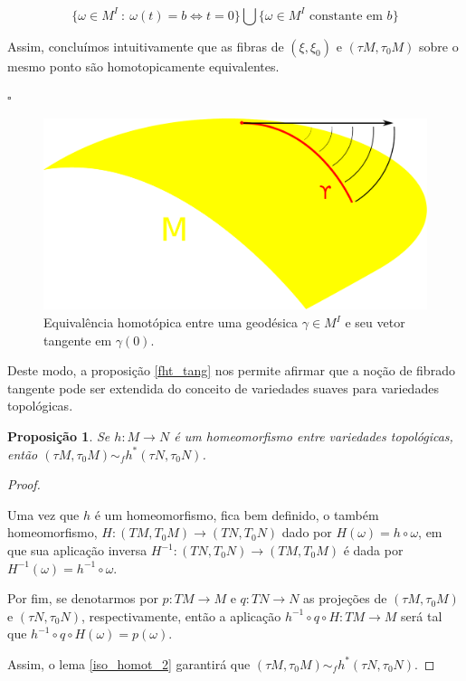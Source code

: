 \documentclass[12pt,oneside]{book} %
\newtheorem{prop}   {\hspace{0.5cm}Proposi\c c\~ao}[chapter]
\begin{document}
$$ \{ \omega\in M^{I} \ : \ \omega(t)=b \Leftrightarrow t=0 \}\bigcup \{ \omega\in M^{I} \mbox{ constante em } b \} $$

\par Assim, concluímos intuitivamente que as fibras de $(\xi,\xi_{0})$ e $(\tau M,\tau_{0}M)$ sobre o mesmo ponto são homotopicamente equivalentes.

\begin{flushright}
	$\square$
\end{flushright}

\begin{figure}[h]
	\centering
	\includegraphics[scale=0.3]{fibrado_tang.pdf}
	\caption{Equivalência homotópica entre uma geodésica $\gamma\in M^{I}$ e seu vetor tangente em $\gamma(0)$.}
\end{figure}

\par Deste modo, a proposição \ref{fht_tang} nos permite afirmar que a noção de fibrado tangente pode ser extendida do conceito de variedades suaves para variedades topológicas.

\begin{prop}\label{iso_homeo}
	Se $h:M\to N$ é um homeomorfismo entre variedades topológicas, então $(\tau M,\tau_{0}M)\sim_{f}h^{*}(\tau N,\tau_{0}N)$.
\end{prop}
\begin{proof}
	
	\
	
	\par Uma vez que $h$ é um homeomorfismo, fica bem definido, o também homeomorfismo, $H:(TM,T_{0}M)\to (TN,T_{0}N)$ dado por $H(\omega)=h\circ\omega$, em que sua aplicação inversa $H^{-1}:(TN,T_{0}N)\to (TM,T_{0}M)$ é dada por $H^{-1}(\omega)=h^{-1}\circ\omega$.
	
	\par Por fim, se denotarmos por $p:TM\to M$ e $q:TN\to N$ as projeções de $(\tau M,\tau_{0}M)$ e $(\tau N,\tau_{0}N)$,  respectivamente, então a aplicação $h^{-1}\circ q\circ H:TM\to M$ será tal que $h^{-1}\circ q\circ H(\omega)=p(\omega)$.
	
	\par Assim, o lema \ref{iso_homot_2} garantirá que $(\tau M,\tau_{0}M)\sim_{f}h^{*}(\tau N,\tau_{0}N)$.
	
\end{proof}
\end{document}
